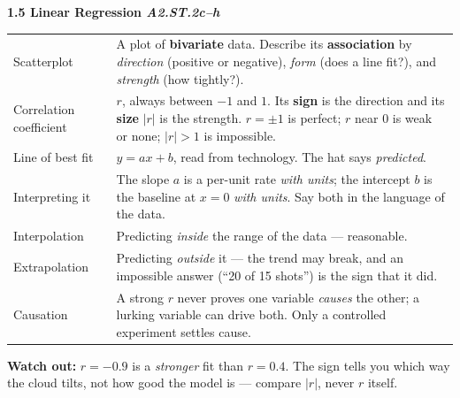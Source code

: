 \documentclass[10pt]{article}
\newcommand{\sghead}[2]{%
  \boxguard[10]%
  \vspace{4pt}\par\noindent
  \colorbox{forest}{\parbox{\dimexpr\linewidth-2\fboxsep}{%
    \small\color{white}\bfseries #1 \hfill \textmd{\itshape\scriptsize\color{forestmid} #2}}}%
  \vspace{2pt}\par}
\newcommand{\sgwatch}[1]{%
  \vspace{1pt}\par\noindent
  \colorbox{redbg}{\parbox{\dimexpr\linewidth-2\fboxsep}{%
    \footnotesize\textbf{\textcolor{redacc}{Watch out:}} #1}}%
  \vspace{1pt}\par}
\newcommand{\sgtabsetup}{\renewcommand{\arraystretch}{1.06}\footnotesize}
\begin{document}
\sghead{1.5 \quad Linear Regression}{A2.ST.2c--h}
{\sgtabsetup
\begin{tabularx}{\linewidth}{@{} G X @{}}
Scatterplot & A plot of \textbf{bivariate} data. Describe its \textbf{association} by
  \emph{direction} (positive or negative), \emph{form} (does a line fit?), and \emph{strength}
  (how tightly?). \\
Correlation coefficient & $r$, always between $-1$ and $1$. Its \textbf{sign} is the direction
  and its \textbf{size} $|r|$ is the strength. $r=\pm 1$ is perfect; $r$ near $0$ is weak or
  none; $|r|>1$ is impossible. \\
Line of best fit & $\hat y = ax+b$, read from technology. The hat says \emph{predicted}. \\
Interpreting it & The slope $a$ is a per-unit rate \emph{with units}; the intercept $b$ is the
  baseline at $x=0$ \emph{with units}. Say both in the language of the data. \\
Interpolation & Predicting \emph{inside} the range of the data --- reasonable. \\
Extrapolation & Predicting \emph{outside} it --- the trend may break, and an impossible answer
  (``20 of 15 shots'') is the sign that it did. \\
Causation & A strong $r$ never proves one variable \emph{causes} the other; a lurking variable
  can drive both. Only a controlled experiment settles cause. \\
\end{tabularx}}
\sgwatch{$r=-0.9$ is a \emph{stronger} fit than $r=0.4$. The sign tells you which way the cloud
tilts, not how good the model is --- compare $|r|$, never $r$ itself.}
\end{document}
